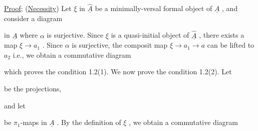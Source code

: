 \underline{Proof}; (\underline{Necessity}) Let $\xi$ in $\hat{\underline{A}}$ be a minimally-versal formal object of $\underline{A}$ , and consider a diagram

\begin{center}
\end{center}
in $\underline{A}$ where $\alpha$ is surjective. Since $\xi$ is a quasi-initial object of $\hat{\underline{A}}$ , there exists a map $\xi \to a_1$ . Since $\alpha$ is surjective, the composit map $\xi \to a_1 \to a$ can be lifted to $a_2$ i.e., we obtain a commutative diagram

\begin{center}
\end{center}
which proves the condition 1.2(1). We now prove the condition 1.2(2). Let

\begin{center}
\end{center}
be the projections,

and let

\begin{center}
\end{center}
be $\pi_1$-maps in $\underline{A}$ . By the definition of $\xi$ , we obtain a commutative diagram

